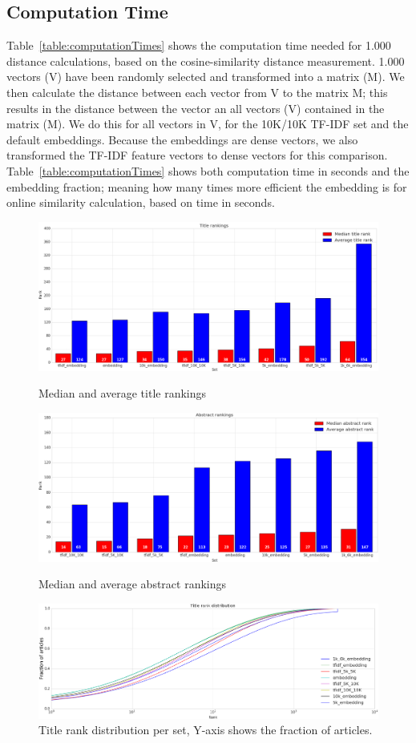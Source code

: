 \documentclass[runningheads]{llncs}
\begin{document}
\subsection{Computation Time}
Table~\ref{table:computationTimes} shows the computation time needed for 1.000 distance calculations, based on the cosine-similarity distance measurement. 1.000 vectors (V) have been randomly selected and transformed into a matrix (M). We then calculate the distance between each vector from V to the matrix M; this results in the distance between the vector an all vectors (V) contained in the matrix (M). We do this for all vectors in V, for the 10K/10K TF-IDF set and the default embeddings. Because the embeddings are dense vectors, we also transformed the TF-IDF feature vectors to dense vectors for this comparison. Table~\ref{table:computationTimes} shows both computation time in seconds and the embedding fraction; meaning how many times more efficient the embedding is for online similarity calculation, based on time in seconds.
\FloatBarrier
\begin{figure}
\includegraphics[width=4.5in]{Plots/Title_rankings}
\caption{Median and average title rankings}\label{figure:titleRanks}
\includegraphics[width=4.5in]{Plots/Abstract_rankings}
\caption{Median and average abstract rankings}\label{figure:abstractRanks}
\includegraphics[width=4.5in]{Plots/Title_rank_distribution}
\caption{Title rank distribution per set, Y-axis shows the fraction of articles.}\label{figure:titleDistribution}
\end{figure}
\end{document}
